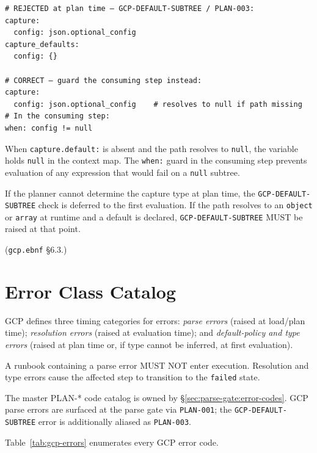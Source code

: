 \begin{verbatim}
# REJECTED at plan time — GCP-DEFAULT-SUBTREE / PLAN-003:
capture:
  config: json.optional_config
capture_defaults:
  config: {}

# CORRECT — guard the consuming step instead:
capture:
  config: json.optional_config    # resolves to null if path missing
# In the consuming step:
when: config != null
\end{verbatim}

When \texttt{capture.default:} is absent and the path resolves to
\texttt{null}, the variable holds \texttt{null} in the context map.
The \texttt{when:} guard in the consuming step prevents evaluation of any
expression that would fail on a \texttt{null} subtree.

If the planner cannot determine the capture type at plan time, the
\texttt{GCP-DEFAULT-SUBTREE} check is deferred to the first evaluation.
If the path resolves to an \texttt{object} or \texttt{array} at runtime
and a default is declared, \texttt{GCP-DEFAULT-SUBTREE} MUST be raised
at that point.

(\texttt{gcp.ebnf} \S6.3.)

\section{Error Class Catalog}
\label{sec:gcp:errors}

GCP defines three timing categories for errors:
\emph{parse errors} (raised at load/plan time);
\emph{resolution errors} (raised at evaluation time);
and \emph{default-policy and type errors} (raised at plan time or, if type
cannot be inferred, at first evaluation).

A runbook containing a parse error MUST NOT enter execution.
Resolution and type errors cause the affected step to transition to the
\texttt{failed} state.

The master PLAN-* code catalog is owned by \S\ref{sec:parse-gate:error-codes}.
GCP parse errors are surfaced at the parse gate via \texttt{PLAN-001};
the \texttt{GCP-DEFAULT-SUBTREE} error is additionally aliased as
\texttt{PLAN-003}.

Table~\ref{tab:gcp-errors} enumerates every GCP error code.

